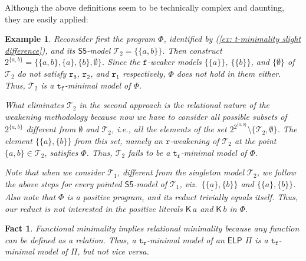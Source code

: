 \documentclass[submission,copyright,creativecommons]{eptcs}
\newcommand{\set}[1]  { \{ #1 \} }
\newcommand{\logic}[1]  { \ensuremath{\mathsf{#1}} }
\newcommand{\sfive}  { \logic{S5} }
\newcommand{\ELP}  { \logic{ELP} }
\newcommand{\epispec}  { \Pi }
\newcommand{\K}  { \mathsf{K} }
\newcommand{\functional}  { \texttt{f} }
\newcommand{\relational}  { \texttt{r} }
\newcommand{\tfunctional}  { \texttt{t}_{\!\functional} }
\newcommand{\trelational}  { \texttt{t}_{\!\relational} }
\newtheorem{example}{Example}
\newtheorem{fact}{Fact}
\begin{document}
Although the above definitions seem to be technically complex and daunting, 
they are easily applied:
%
\begin{example}
\label{ex: t-minimality slight difference cont'd} \normalfont
Reconsider first the program $\Phi$, 
identified by (\ref{ex: t-minimality slight difference}), 
and its $\sfive$-model $\mathcal T_2=\set{\set{a,b}}$. Then 
construct $2^{\set{a,b}} = \set{\set{a,b}, \set a, \set b, \emptyset}$. Since the
$\functional$-weaker models $\set{\set a}$, $\set{\set b}$, and $\set{\emptyset}$ of $\mathcal T_2$
do not satisfy $\mathtt{r_3}$, $\mathtt{r_2}$, and $\mathtt{r_1}$ respectively, $\Phi$ does not hold in them either. Thus, $\mathcal T_2$ is
a $\tfunctional$-minimal model of $\Phi$.

What eliminates $\mathcal T_2$ in the second approach is the relational nature 
of the weakening methodology because now we have to consider all possible subsets 
of $2^{\set{a,b}}$ different from $\emptyset$ and $\mathcal T_2$, i.e., all the elements of the set $2^{2^{\set{a,b}}}\setminus \set{\mathcal T_2, \emptyset}$. 
The element $\set{\set a , \set b}$
from this set, namely an $\relational$-weakening of $\mathcal T_2$ at the point
$\set{a,b} \in \mathcal T_2$, satisfies $\Phi$. Thus, $\mathcal T_2$ fails to be a $\trelational$-minimal model of $\Phi$.

Note that when we consider $\mathcal T_1$, different from the singleton model
$\mathcal T_2$, we follow the above steps
for every pointed $\sfive$-model of $\mathcal T_1$, viz.\ 
$\set{\underline{\set a}, \set b}$ and $\set{\set a, \underline{\set b}}$. 
Also note that $\Phi$
is a positive program, and its reduct trivially equals itself. 
Thus, our reduct is not interested in
the positive literals $\K\,a$ and $\K\,b$ in $\Phi$.
\end{example}
%
\begin{fact} \normalfont
Functional minimality implies relational minimality 
because any function can be defined as a relation. 
Thus, a $\trelational$-minimal model of an $\ELP$
$\epispec$ is a $\tfunctional$-minimal model of $\epispec$, 
but not vice versa. 
\end{fact}
%
\end{document}
